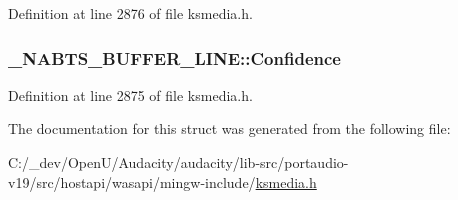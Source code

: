 Definition at line 2876 of file ksmedia.\+h.

\subsubsection[{\texorpdfstring{Confidence}{Confidence}}]{ \+\_\+\+N\+A\+B\+T\+S\+\_\+\+B\+U\+F\+F\+E\+R\+\_\+\+L\+I\+N\+E\+::\+Confidence}\hypertarget{struct___n_a_b_t_s___b_u_f_f_e_r___l_i_n_e_a63861f61dda193ee9c1c3c691f674ec5}{}\label{struct___n_a_b_t_s___b_u_f_f_e_r___l_i_n_e_a63861f61dda193ee9c1c3c691f674ec5}


Definition at line 2875 of file ksmedia.\+h.



The documentation for this struct was generated from the following file\+:\begin{DoxyCompactItemize}
\item 
C\+:/\+\_\+dev/\+Open\+U/\+Audacity/audacity/lib-\/src/portaudio-\/v19/src/hostapi/wasapi/mingw-\/include/\hyperlink{ksmedia_8h}{ksmedia.\+h}\end{DoxyCompactItemize}
